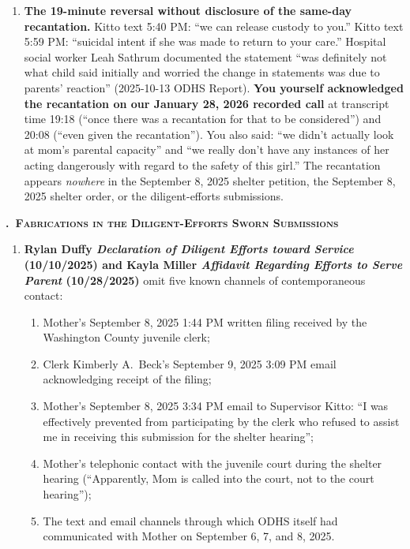 \documentclass[10pt,a4paper,roman]{moderncv}
\newcounter{legalsection}
\newcounter{legalsubsection}[legalsection]
\renewcommand{\thelegalsubsection}{\Alph{legalsubsection}}
\newcommand{\legalsubsection}[1]{%
	\refstepcounter{legalsubsection}%
	\par\addvspace{0.85em}%
	{\color{inkblue}\normalfont\normalsize\bfseries\scshape
		\thelegalsubsection.\hspace{0.45em}#1\par}%
	\vspace{0.2em}%
}
\begin{document}
\begin{enumerate}[leftmargin=*,itemsep=0.35em,topsep=0.3em,resume]
\begin{enumerate}[leftmargin=*,itemsep=0.35em,topsep=0.3em,resume]
	\item \textbf{The 19-minute reversal without disclosure of the same-day recantation.} Kitto text 5:40 PM: ``we can release custody to you.'' Kitto text 5:59 PM: ``suicidal intent if she was made to return to your care.'' Hospital social worker Leah Sathrum documented the statement ``was definitely not what child said initially and worried the change in statements was due to parents' reaction'' (2025-10-13 ODHS Report). \textbf{You yourself acknowledged the recantation on our January 28, 2026 recorded call} at transcript time 19:18 (``once there was a recantation for that to be considered'') and 20:08 (``even given the recantation''). You also said: ``we didn't actually look at mom's parental capacity'' and ``we really don't have any instances of her acting dangerously with regard to the safety of this girl.'' The recantation appears \emph{nowhere} in the September 8, 2025 shelter petition, the September 8, 2025 shelter order, or the diligent-efforts submissions.
\end{enumerate}

\legalsubsection{~Fabrications in the Diligent-Efforts Sworn Submissions}

\begin{enumerate}[leftmargin=*,itemsep=0.35em,topsep=0.3em,resume]
	\item \textbf{Rylan Duffy \emph{Declaration of Diligent Efforts toward Service} (10/10/2025) and Kayla Miller \emph{Affidavit Regarding Efforts to Serve Parent} (10/28/2025)} omit five known channels of contemporaneous contact:
	
	\begin{enumerate}[label=(\alph*),leftmargin=1.5em]
		\item Mother's September 8, 2025 1:44 PM written filing received by the Washington County juvenile clerk;
		\item Clerk Kimberly A.~Beck's September 9, 2025 3:09 PM email acknowledging receipt of the filing;
		\item Mother's September 8, 2025 3:34 PM email to Supervisor Kitto: ``I was effectively prevented from participating by the clerk who refused to assist me in receiving this submission for the shelter hearing'';
		\item Mother's telephonic contact with the juvenile court during the shelter hearing (``Apparently, Mom is called into the court, not to the court hearing'');
		\item The text and email channels through which ODHS itself had communicated with Mother on September 6, 7, and 8, 2025.
	\end{enumerate}
	

\end{enumerate}
\end{enumerate}
\end{document}
